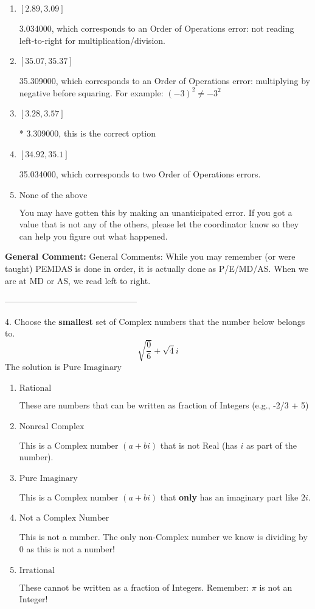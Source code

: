 \documentclass{extbook}[14pt]
\begin{document}
\begin{enumerate}[label=\Alph*.] 
\item $ [2.89, 3.09] $ 

  3.034000, which corresponds to an Order of Operations error: not reading left-to-right for multiplication/division. 
\item $ [35.07, 35.37] $ 

  35.309000, which corresponds to an Order of Operations error: multiplying by negative before squaring. For example: $(-3)^2 \neq -3^2$ 
\item $ [3.28, 3.57] $ 

 * 3.309000, this is the correct option 
\item $ [34.92, 35.1] $ 

  35.034000, which corresponds to two Order of Operations errors. 
\item $ \text{None of the above} $ 

  You may have gotten this by making an unanticipated error. If you got a value that is not any of the others, please let the coordinator know so they can help you figure out what happened. 
\end{enumerate} 
 
\textbf{General Comment:} General Comments: While you may remember (or were taught) PEMDAS is done in order, it is actually done as P/E/MD/AS. When we are at MD or AS, we read left to right. 

-----------------------------------------------

4. Choose the \textbf{smallest} set of Complex numbers that the number below belongs to.
\[ \sqrt{\frac{0}{6}}+\sqrt{4}i \] 
The solution is $ \text{Pure Imaginary} $ 

\begin{enumerate}[label=\Alph*.] 
\item $ \text{Rational} $ 

 These are numbers that can be written as fraction of Integers (e.g., -2/3 + 5) 
\item $ \text{Nonreal Complex} $ 

 This is a Complex number $(a+bi)$ that is not Real (has $i$ as part of the number). 
\item $ \text{Pure Imaginary} $ 

 This is a Complex number $(a+bi)$ that \textbf{only} has an imaginary part like $2i$. 
\item $ \text{Not a Complex Number} $ 

 This is not a number. The only non-Complex number we know is dividing by 0 as this is not a number! 
\item $ \text{Irrational} $ 

 These cannot be written as a fraction of Integers. Remember: $\pi$ is not an Integer! 
\end{enumerate} 
 
\end{document}
